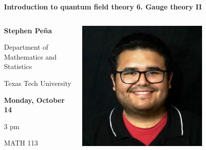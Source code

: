 \documentclass[compress,aspectratio=169]{beamer}
\date{}
\begin{document}
\begin{frame}[fragile]
\centering
\textbf{\huge
Introduction to quantum field theory 6.  Gauge theory II}
\vspace{1em}
\begin{columns}
\begin{column}{0.55\textwidth}
\centering
\textbf{
}

\textbf{
\large
Stephen Peña
}

Department of Mathematics and Statistics

Texas Tech University

\vspace{2em}
\textbf{
Monday, October 14
}

3 pm

MATH 113

\end{column}
\begin{column}{0.45\textwidth}
\centering
\includegraphics[width=0.7\textwidth]{Pena_Stephen.jpg}

\end{column}
\end{columns}


\end{frame}
\end{document}
